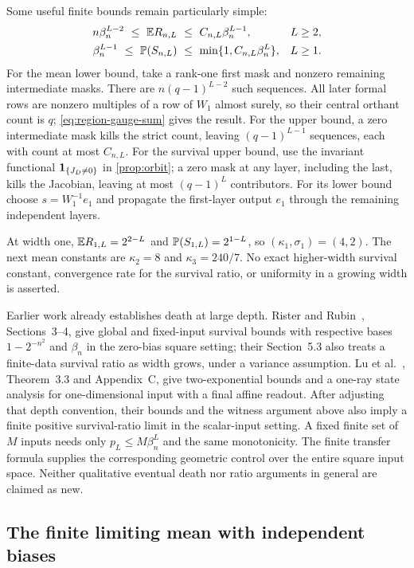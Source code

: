 Some useful finite bounds remain particularly simple:
\begin{align}
n\beta_n^{L-2}\ \le\ \E R_{n,L}\ &\le\ C_{n,L}\beta_n^{L-1},&&L\ge2,\label{eq:depth-strict}\\
\beta_n^{L-1}\ \le\ \PP(S_{n,L})\ &\le\ \min\{1,C_{n,L}\beta_n^L\},&&L\ge1.\label{eq:depth-survival}
\end{align}
For the mean lower bound, take a rank-one first mask and nonzero remaining intermediate masks. There are $n(q-1)^{L-2}$ such sequences. All later formal rows are nonzero multiples of a row of $W_1$ almost surely, so their central orthant count is $q$; \cref{eq:region-gauge-sum} gives the result. For the upper bound, a zero intermediate mask kills the strict count, leaving $(q-1)^{L-1}$ sequences, each with count at most $C_{n,L}$. For the survival upper bound, use the invariant functional $\mathbf{1}_{\{J_D\ne0\}}$ in \cref{prop:orbit}; a zero mask at any layer, including the last, kills the Jacobian, leaving at most $(q-1)^L$ contributors. For its lower bound choose $s=W_1^{-1}e_1$ and propagate the first-layer output $e_1$ through the remaining independent layers.

At width one, $\mathbb{E} R_{1,L}=2^{2-L}$ and $\mathbb{P}(S_{1,L})=2^{1-L}$, so $(\kappa_1,\sigma_1)=(4,2)$. The next mean constants are $\kappa_2=8$ and $\kappa_3=240/7$. No exact higher-width survival constant, convergence rate for the survival ratio, or uniformity in a growing width is asserted.

Earlier work already establishes death at large depth. Rister and Rubin~\cite{rister2021}, Sections~3--4, give global and fixed-input survival bounds with respective bases $1-2^{-n^2}$ and $\beta_n$ in the zero-bias square setting; their Section~5.3 also treats a finite-data survival ratio as width grows, under a variance assumption. Lu et al.~\cite{lu2020}, Theorem~3.3 and Appendix~C, give two-exponential bounds and a one-ray state analysis for one-dimensional input with a final affine readout. After adjusting that depth convention, their bounds and the witness argument above also imply a finite positive survival-ratio limit in the scalar-input setting. A fixed finite set of $M$ inputs needs only $p_L\le M\beta_n^L$ and the same monotonicity. The finite transfer formula supplies the corresponding geometric control over the entire square input space. Neither qualitative eventual death nor ratio arguments in general are claimed as new.

\subsection{The finite limiting mean with independent biases}

